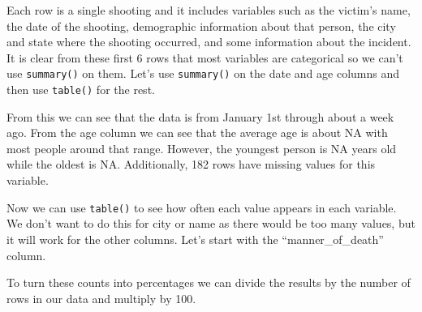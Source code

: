 \documentclass[
  12pt,
]{book}
\newenvironment{Shaded}{\begin{snugshade}}{\end{snugshade}}
\newcommand{\CommentTok}[1]{\textcolor[rgb]{0.37,0.37,0.37}{\textit{#1}}}
\newcommand{\DecValTok}[1]{\textcolor[rgb]{0.06,0.06,0.06}{#1}}
\newcommand{\KeywordTok}[1]{\textcolor[rgb]{0.27,0.27,0.27}{\textbf{#1}}}
\newcommand{\NormalTok}[1]{#1}
\newcommand{\OperatorTok}[1]{\textcolor[rgb]{0.43,0.43,0.43}{\textbf{#1}}}
\newcommand{\StringTok}[1]{\textcolor[rgb]{0.5,0.5,0.5}{#1}}
\begin{document}
Each row is a single shooting and it includes variables such as the victim's name, the date of the shooting, demographic information about that person, the city and state where the shooting occurred, and some information about the incident. It is clear from these first 6 rows that most variables are categorical so we can't use \texttt{summary()} on them. Let's use \texttt{summary()} on the date and age columns and then use \texttt{table()} for the rest.

\begin{Shaded}
\end{Shaded}

From this we can see that the data is from January 1st through about a week ago. From the age column we can see that the average age is about NA with most people around that range. However, the youngest person is NA years old while the oldest is NA. Additionally, 182 rows have missing values for this variable.

Now we can use \texttt{table()} to see how often each value appears in each variable. We don't want to do this for city or name as there would be too many values, but it will work for the other columns. Let's start with the ``manner\_of\_death'' column.

\begin{Shaded}
\end{Shaded}

To turn these counts into percentages we can divide the results by the number of rows in our data and multiply by 100.

\begin{Shaded}
\end{Shaded}
\end{document}
